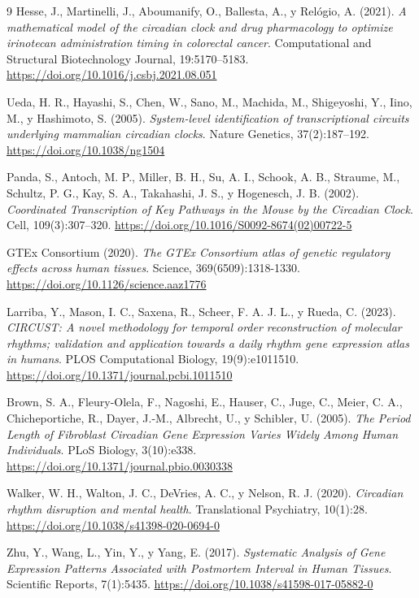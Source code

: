 \documentclass[12pt, a4paper]{report}
\begin{document}
\begin{thebibliography}{9}
Hesse, J., Martinelli, J., Aboumanify, O., Ballesta, A., y Relógio, A. (2021).
\textit{A mathematical model of the circadian clock and drug pharmacology to optimize irinotecan administration timing in colorectal cancer}.
Computational and Structural Biotechnology Journal, 19:5170--5183. \url{https://doi.org/10.1016/j.csbj.2021.08.051}

Ueda, H. R., Hayashi, S., Chen, W., Sano, M., Machida, M., Shigeyoshi, Y., Iino, M., y Hashimoto, S. (2005).
\textit{System-level identification of transcriptional circuits underlying mammalian circadian clocks}.
Nature Genetics, 37(2):187--192. \url{https://doi.org/10.1038/ng1504}

Panda, S., Antoch, M. P., Miller, B. H., Su, A. I., Schook, A. B., Straume, M., Schultz, P. G., Kay, S. A., Takahashi, J. S., y Hogenesch, J. B. (2002).
\textit{Coordinated Transcription of Key Pathways in the Mouse by the Circadian Clock}.
Cell, 109(3):307--320. \url{https://doi.org/10.1016/S0092-8674(02)00722-5}

GTEx Consortium (2020).
\textit{The GTEx Consortium atlas of genetic regulatory effects across human tissues}.
Science, 369(6509):1318-1330. \url{https://doi.org/10.1126/science.aaz1776}

Larriba, Y., Mason, I. C., Saxena, R., Scheer, F. A. J. L., y Rueda, C. (2023).
\textit{CIRCUST: A novel methodology for temporal order reconstruction of molecular rhythms; validation and application towards a daily rhythm gene expression atlas in humans}.
PLOS Computational Biology, 19(9):e1011510. \url{https://doi.org/10.1371/journal.pcbi.1011510}

Brown, S. A., Fleury-Olela, F., Nagoshi, E., Hauser, C., Juge, C., Meier, C. A., Chicheportiche, R., Dayer, J.-M., Albrecht, U., y Schibler, U. (2005).
\textit{The Period Length of Fibroblast Circadian Gene Expression Varies Widely Among Human Individuals}.
PLoS Biology, 3(10):e338. \url{https://doi.org/10.1371/journal.pbio.0030338}

Walker, W. H., Walton, J. C., DeVries, A. C., y Nelson, R. J. (2020).
\textit{Circadian rhythm disruption and mental health}.
Translational Psychiatry, 10(1):28. \url{https://doi.org/10.1038/s41398-020-0694-0}

Zhu, Y., Wang, L., Yin, Y., y Yang, E. (2017).
\textit{Systematic Analysis of Gene Expression Patterns Associated with Postmortem Interval in Human Tissues}.
Scientific Reports, 7(1):5435. \url{https://doi.org/10.1038/s41598-017-05882-0}


\end{thebibliography}
\end{document}
